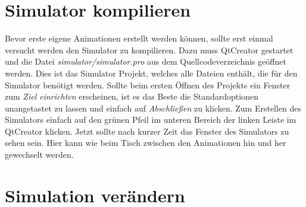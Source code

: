 \documentclass[10pt,a4paper]{article}
\begin{document}
\section{Simulator kompilieren}
Bevor erste eigene Animationen erstellt werden können, sollte erst einmal versucht werden den Simulator zu kompilieren.
Dazu muss QtCreator gestartet und die Datei \textit{simulator/simulator.pro} aus dem Quellcodeverzeichnis geöffnet werden.
Dies ist das Simulator Projekt, welches alle Dateien enthält, die für den Simulator benötigt werden.
Sollte beim ersten Öffnen des Projekts ein Fenster zum \textit{Ziel einrichten} erscheinen, ist es das Beste die Standardoptionen unangetastet zu lassen und einfach auf \textit{Abschließen} zu klicken.
Zum Erstellen des Simulators einfach auf den grünen Pfeil im unteren Bereich der linken Leiste im QtCreator klicken. Jetzt sollte nach kurzer Zeit das Fenster des Simulators zu sehen sein. Hier kann wie beim Tisch zwischen den Animationen hin und her gewechselt werden.

\section{Simulation verändern}
\end{document}
